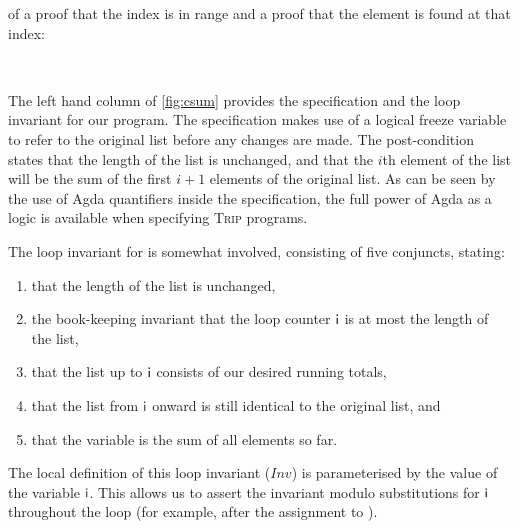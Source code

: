 \documentclass[sigplan,review]{acmart}\settopmatter{printfolios=true,printccs=false,printacmref=false}
\begin{document}
of a proof that the index is in range and a proof that the element 
is found at that index:
\begin{code}
\>[2]\AgdaOperator{\AgdaFunction{\AgdaUnderscore{}[\AgdaUnderscore{}]=\AgdaUnderscore{}}}\AgdaSpace{}%
\AgdaSymbol{:}\AgdaSpace{}%
\AgdaSpace{}%
\AgdaSpace{}%
\AgdaSpace{}%
\AgdaSpace{}%
\AgdaSpace{}%
\AgdaSpace{}%
\AgdaSpace{}%
\<%
\\
%
\>[2]\AgdaSpace{}%
\AgdaOperator{\AgdaFunction{[}}\AgdaSpace{}%
\AgdaSpace{}%
\AgdaOperator{\AgdaFunction{]=}}\AgdaSpace{}%
\AgdaSpace{}%
\AgdaSymbol{=}\AgdaSpace{}%
\AgdaSpace{}%
\AgdaSymbol{(}\AgdaSpace{}%
\AgdaOperator{\AgdaFunction{<}}\AgdaSpace{}%
\AgdaSpace{}%
\AgdaSymbol{)}\AgdaSpace{}%
\AgdaSpace{}%
\AgdaSpace{}%
\AgdaSpace{}%
\AgdaSymbol{(}\AgdaSpace{}%
\AgdaOperator{\AgdaFunction{!}}\AgdaSpace{}%
\AgdaSymbol{)}\AgdaSpace{}%
\AgdaSpace{}%
\<%
\end{code}
The left hand column of \autoref{fig:csum} provides 
the specification and the loop invariant for our program.
The specification makes use of a logical freeze variable 
to refer to the original list before any changes are made. 
The post-condition states that the length of the list is unchanged,
and that the $i$th element of the list will be the sum of the first $i + 1$
elements of the original list. As can be seen by the use of Agda quantifiers
inside the specification, the full power of Agda as a logic is available when 
specifying \textsc{Trip} programs.

The loop invariant for  is somewhat involved, consisting 
of five conjuncts, stating:
\begin{enumerate}
  \item that the length of the list is unchanged, 
  \item the book-keeping invariant that the loop counter $\AgdaField{i}$ is at most 
        the length of the list, 
  \item that the list up to $\AgdaField{i}$ consists of our desired running totals, 
  \item that the list from $\AgdaField{i}$ onward is still identical to the original list, and 
  \item that the variable  is the sum of all elements so far.
\end{enumerate}
The local definition of this loop invariant ($\mathit{Inv}$) is parameterised by the 
value of the variable $\AgdaField{i}$. This allows us to assert the invariant modulo substitutions
for $\AgdaField{i}$ throughout the loop (for example, after the assignment to ). 
\end{document}
